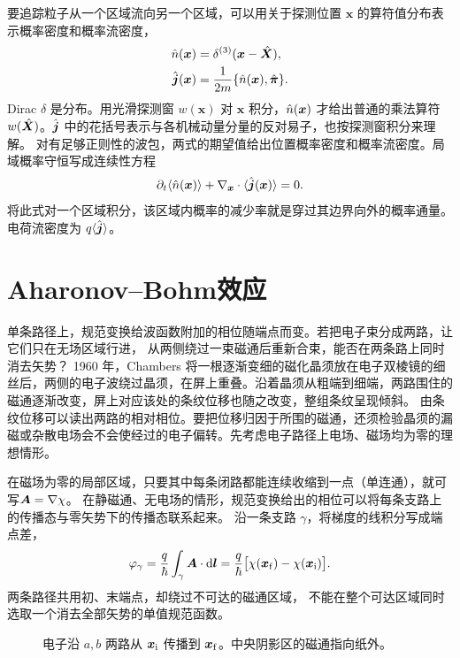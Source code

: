 要追踪粒子从一个区域流向另一个区域，可以用关于探测位置 $\bm x$ 的算符值分布表示概率密度和概率流密度，
\begin{subequations}
    \begin{align}
        \hat{n}(\bm x) &= \delta^{(3)}(\bm x - \hat{\bm{X}}),\\
        \hat{\bm{j}}(\bm x) &= \frac1{2m}\{\hat{n}(\bm x),\hat{\bm{\pi}}\}.
    \end{align}
\end{subequations}
Dirac $\delta$ 是分布。用光滑探测窗 $w(\bm x)$ 对 $\bm x$ 积分，$\hat{n}(\bm x)$ 才给出普通的乘法算符 $w(\hat{\bm{X}})$。$\hat{\bm{j}}$ 中的花括号表示与各机械动量分量的反对易子，也按探测窗积分来理解。
对有足够正则性的波包，两式的期望值给出位置概率密度和概率流密度。局域概率守恒写成连续性方程
\begin{equation}
    \partial_t\langle\hat{n}(\bm x)\rangle + \nabla_{\bm x} \cdot \langle\hat{\bm{j}}(\bm x)\rangle = 0.
\end{equation}
将此式对一个区域积分，该区域内概率的减少率就是穿过其边界向外的概率通量。电荷流密度为 $q\langle\hat{\bm{j}}\rangle$。

\section{Aharonov--Bohm效应}
\label{sec:ab}
单条路径上，规范变换给波函数附加的相位随端点而变。若把电子束分成两路，让它们只在无场区域行进，
从两侧绕过一束磁通后重新合束，能否在两条路上同时消去矢势？
1960 年，Chambers 将一根逐渐变细的磁化晶须放在电子双棱镜的细丝后，两侧的电子波绕过晶须，在屏上重叠。沿着晶须从粗端到细端，两路围住的磁通逐渐改变，屏上对应该处的条纹位移也随之改变，整组条纹呈现倾斜\cite{abexp}。
由条纹位移可以读出两路的相对相位。要把位移归因于所围的磁通，还须检验晶须的漏磁或杂散电场会不会使经过的电子偏转。先考虑电子路径上电场、磁场均为零的理想情形。

在磁场为零的局部区域，只要其中每条闭路都能连续收缩到一点（单连通），就可写$\bm A = \nabla\chi$。
在静磁通、无电场的情形，规范变换给出的相位可以将每条支路上的传播态与零矢势下的传播态联系起来。
沿一条支路 $\gamma$，将梯度的线积分写成端点差，
\begin{equation}\label{eq:qm-gauge-open-path-phase}
    \varphi_\gamma = \frac q\hbar\int_\gamma\bm A \cdot \mathop{}\!\mathrm{d}\bm l
    = \frac q\hbar\bigl[\chi(\bm x_\mathrm f) - \chi(\bm x_\mathrm i)\bigr] .
\end{equation}
两条路径共用初、末端点，却绕过不可达的磁通区域，
不能在整个可达区域同时选取一个消去全部矢势的单值规范函数。
\begin{figure}[htbp]
    \centering{}
    \caption{电子沿 $a,b$ 两路从 $\bm x_\mathrm i$ 传播到 $\bm x_\mathrm f$。中央阴影区的磁通指向纸外。}\label{fig:flux-paths}
\end{figure}

